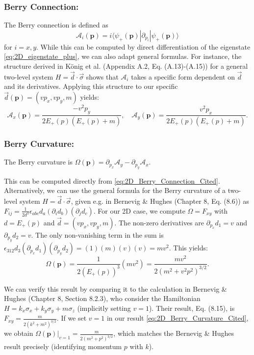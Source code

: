 \documentclass[11pt]{article}
\begin{document}
\subsubsection{Berry Connection:}
The Berry connection is defined as 
$$\mathcal{A}_i(\mathbf{p}) = i \langle \psi_+(\mathbf{p}) | \partial_{p_i} | \psi_+(\mathbf{p}) \rangle$$
for $i=x,y$. While this can be computed by direct differentiation of the eigenstate \eqref{eq:2D_eigenstate_plus}, we can also adapt general formulas. For instance, the structure derived in König et al. \cite{PhysRevB.88.035106} (Appendix A.2, Eq. (A.13)-(A.15)) for a general two-level system $H = \vec{d} \cdot \vec{\sigma}$ shows that $\mathcal{A}_i$ takes a specific form dependent on $\vec{d}$ and its derivatives. Applying this structure to our specific $\vec{d}(\mathbf{p}) = (v p_x, v p_y, m)$ yields:
\begin{equation}
\mathcal{A}_x(\mathbf{p}) = \frac{-v^2 p_y}{2 E_+(p) (E_+(p) + m)}, \quad \mathcal{A}_y(\mathbf{p}) = \frac{v^2 p_x}{2 E_+(p) (E_+(p) + m)}.
\label{eq:2D_Berry_Connection_Cited}
\end{equation}

\subsubsection{Berry Curvature:}

The Berry curvature is $\Omega(\mathbf{p}) = \partial_{p_x} \mathcal{A}_y - \partial_{p_y} \mathcal{A}_x$. 

This can be computed directly from \eqref{eq:2D_Berry_Connection_Cited}. Alternatively, we can use the general formula for the Berry curvature of a two-level system $H = \vec{d} \cdot \vec{\sigma}$, given e.g. in Bernevig \& Hughes \cite{bernevig2013topological} (Chapter 8, Eq. (8.6)) as $F_{ij} = \frac{1}{2d^3} \epsilon_{abc} d_a (\partial_i d_b) (\partial_j d_c)$. For our 2D case, we compute $\Omega = F_{xy}$ with $d = E_+(p)$ and $\vec{d} = (v p_x, v p_y, m)$. The non-zero derivatives are $\partial_{p_x} d_1 = v$ and $\partial_{p_y} d_2 = v$. The only non-vanishing term in the sum is $\epsilon_{312} d_3 (\partial_{p_x} d_1) (\partial_{p_y} d_2) = (1)(m)(v)(v) = m v^2$. This yields:
\begin{equation}
  \Omega(\mathbf{p}) = \frac{1}{2 (E_+(p))^3} (m v^2) = \boxed{\frac{m v^2}{2 (m^2 + v^2 p^2)^{3/2}}}.
\label{eq:2D_Berry_Curvature_Cited}
\end{equation}

We can verify this result by comparing it to the calculation in Bernevig \& Hughes \cite{bernevig2013topological} (Chapter 8, Section 8.2.3), who consider the Hamiltonian $H = k_x \sigma_x + k_y \sigma_y + m \sigma_z$ (implicitly setting $v=1$). Their result, Eq. (8.15), is $F_{xy} = \frac{m}{2(k^2 + m^2)^{3/2}}$. If we set $v=1$ in our result \eqref{eq:2D_Berry_Curvature_Cited}, we obtain $\Omega(\mathbf{p})|_{v=1} = \frac{m}{2(m^2 + p^2)^{3/2}}$, which matches the Bernevig \& Hughes result precisely (identifying momentum $p$ with $k$). 
\end{document}
